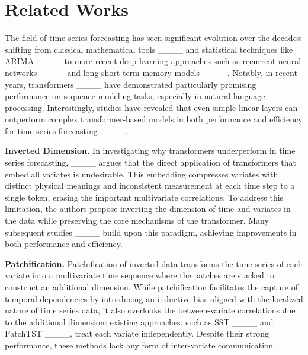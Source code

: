 \section{Related Works}
The field of time series forecasting has seen significant evolution over the decades: shifting from classical mathematical tools ____ and statistical techniques like ARIMA ____ to more recent deep learning approaches such as recurrent neural networks ____ and long-short term memory models ____. Notably, in recent years, transformers ____ have demonstrated particularly promising performance on sequence modeling tasks, especially in natural language processing. Interestingly, studies have revealed that even simple linear layers can outperform complex transformer-based models in both performance and efficiency for time series forecasting ____.

\textbf{Inverted Dimension.}
In investigating why transformers underperform in time series forecasting, ____ argues that the direct application of transformers that embed all variates is undesirable. This embedding compresses variates with distinct physical meanings and inconsistent measurement at each time step to a single token, erasing the important multivariate correlations. To address this limitation, the authors propose inverting the dimension of time and variates in the data while preserving the core mechanisms of the transformer. Many subsequent studies ____ build upon this paradigm, achieving improvements in both performance and efficiency. %

\textbf{Patchification.}
Patchification of inverted data transforms the time series of each variate into a multivariate time sequence where the patches are stacked to construct an additional dimension. While patchification facilitates the capture of temporal dependencies by introducing an inductive bias aligned with the localized nature of time series data, it also overlooks the between-variate correlations due to the additional dimension: existing approaches, such as SST ____ and PatchTST ____, treat each variate independently. Despite their strong performance, these methods lack any form of inter-variate communication. 


